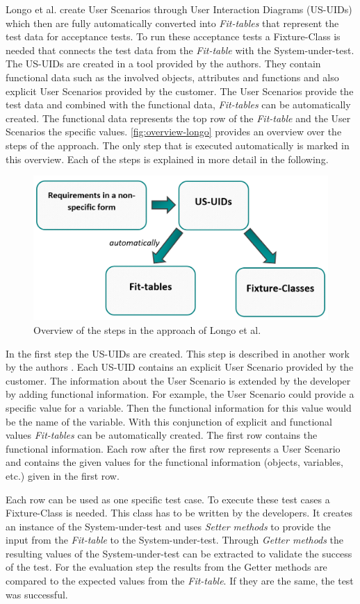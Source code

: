 Longo et al. \cite{longo} create User Scenarios through User Interaction Diagrams (US-UIDs) which then are fully automatically converted into \textit{Fit-tables} that represent the test data for acceptance tests.
To run these acceptance tests a Fixture-Class is needed that connects the test data from the \textit{Fit-table} with the System-under-test.
The US-UIDs are created in a tool provided by the authors.
They contain functional data such as the involved objects, attributes and functions and also explicit User Scenarios provided by the customer.
The User Scenarios provide the test data and combined with the functional data, \textit{Fit-tables} can be automatically created.
The functional data represents the top row of the \textit{Fit-table} and the User Scenarios the specific values.
\autoref{fig:overview-longo} provides an overview over the steps of the approach.
The only step that is executed automatically is marked in this overview.
Each of the steps is explained in more detail in the following.

\begin{figure}[H]
	\centering
	\includegraphics[width=.62\textwidth]{../images/LongoProcess.png}
	\caption{Overview of the steps in the approach of Longo et al.}
	\label{fig:overview-longo}
\end{figure}
\newpage
In the first step the US-UIDs are created.
This step is described in another work by the authors \cite{longo2}.
Each US-UID contains an explicit User Scenario provided by the customer.
The information about the User Scenario is extended by the developer by adding functional information.
For example, the User Scenario could provide a specific value for a variable.
Then the functional information for this value would be the name of the variable.
With this conjunction of explicit and functional values \textit{Fit-tables} can be automatically created.
The first row contains the functional information.
Each row after the first row represents a User Scenario and contains the given values for the functional information (objects, variables, etc.) given in the first row.

Each row can be used as one specific test case.
To execute these test cases a Fixture-Class is needed.
This class has to be written by the developers.
It creates an instance of the System-under-test and uses \textit{Setter methods} to provide the input from the \textit{Fit-table} to the System-under-test.
Through \textit{Getter methods} the resulting values of the System-under-test can be extracted to validate the success of the test.
For the evaluation step the results from the Getter methods are compared to the expected values from the \textit{Fit-table}.
If they are the same, the test was successful.

